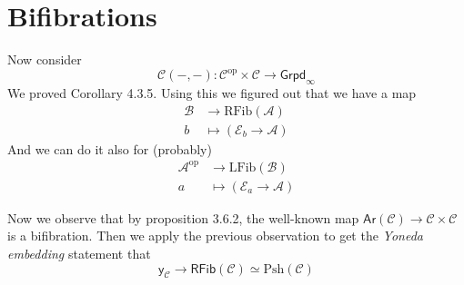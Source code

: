 \section{Bifibrations}
\label{section-bifibrations}

\noindent
Now consider
 $$
\mathcal{C}(-,-):\mathcal{C}^{\text{op}}
\times\mathcal{C}
\to
\mathsf{\text{Grpd}}_{\infty}
$$
We proved Corollary 4.3.5.
Using this we figured out that we have a map
$$
\begin{aligned}
\mathcal{B}&\longrightarrow
\text{RFib}(\mathcal{A}) \\
b&\longmapsto (\mathcal{E}_b \to \mathcal{A})
\end{aligned}
$$
And we can do it also for (probably)
$$
\begin{aligned}
\mathcal{A}^{\text{op}} &\longrightarrow
\text{LFib}(\mathcal{B}) \\
a &\longmapsto (\mathcal{E}_a \to
\mathcal{A})
\end{aligned}
$$

\noindent
Now we observe that by proposition 3.6.2,
the well-known map
$\mathsf{Ar}(\mathcal{C})\to
\mathcal{C}\times \mathcal{C}$
is a bifibration.
Then we apply the previous observation to get
the {\it Yoneda embedding} statement that
 $$
\mathsf{y}_{\mathcal{C}}\to
\mathsf{RFib}(\mathcal{C})\simeq
\text{Psh}(\mathcal{C})
$$

\begin{lemma}
\label{lemma-pullback-bifibration}
\end{lemma}





